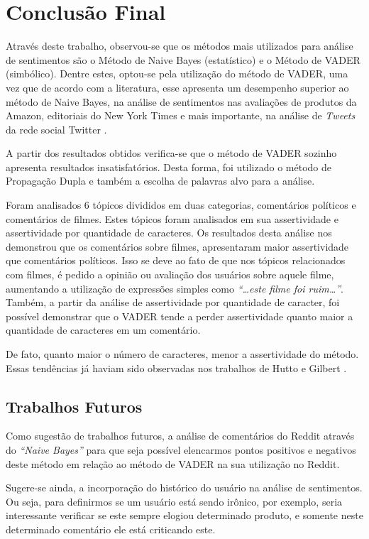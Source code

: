 \chapter{Conclusão Final}
\label{cap:conclusao}
Através deste trabalho, observou-se que os métodos mais utilizados para análise
de sentimentos são o Método de Naive Bayes (estatístico) e o Método de \ac{VADER} (simbólico). Dentre
estes, optou-se pela utilização do método de \ac{VADER}, uma vez que de acordo
com a literatura, esse apresenta um desempenho superior ao método de Naive
Bayes, na análise de sentimentos nas avaliações de
produtos da Amazon, editoriais do New York Times e mais importante, na análise
de \textit{Tweets} da rede social Twitter \cite{SentimentinSocialMedia}.

A partir dos resultados obtidos verifica-se que o método de \ac{VADER} sozinho
apresenta resultados insatisfatórios. Desta forma, foi
utilizado o método de Propagação Dupla e também a escolha de palavras alvo para
a análise. 

Foram analisados 6 tópicos divididos em duas categorias,
comentários políticos e comentários de filmes. Estes tópicos foram analisados em
sua assertividade e assertividade por quantidade de caracteres. Os resultados
desta análise nos demonstrou que os comentários sobre filmes, apresentaram maior
assertividade que comentários políticos. Isso se deve ao fato de que nos tópicos relacionados com filmes, é pedido a opinião
ou avaliação dos usuários sobre aquele filme, aumentando a utilização de
expressões simples como \textit{``\ldots este filme foi ruim\ldots''}. Também, a
partir da análise de assertividade por quantidade de caracter, foi possível
demonstrar que o \ac{VADER} tende a perder assertividade quanto maior a
quantidade de caracteres em um comentário. 

De fato, quanto maior o número de
caracteres, menor a assertividade do método. Essas tendências já haviam sido
observadas nos trabalhos de Hutto e Gilbert \cite{conf/icwsm/HuttoG14}.


\section{Trabalhos Futuros}

Como sugestão de trabalhos futuros, a análise de comentários do Reddit através do
\textit{``Naive Bayes''} para que seja possível elencarmos pontos positivos e
negativos deste método em relação ao método de \ac{VADER} na sua utilização
no Reddit.

Sugere-se ainda, a incorporação do
histórico do usuário na análise de sentimentos. Ou seja, para definirmos se um
usuário está sendo irônico, por exemplo, seria interessante verificar se este
sempre elogiou determinado produto, e somente neste determinado comentário ele está criticando este.
